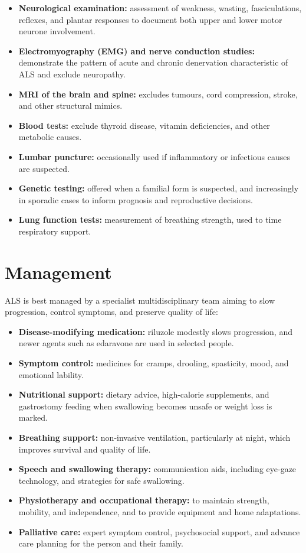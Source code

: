 \begin{itemize}
    \item \textbf{Neurological examination:} assessment of weakness, wasting, fasciculations, reflexes, and plantar responses to document both upper and lower motor neurone involvement.
    \item \textbf{Electromyography (EMG) and nerve conduction studies:} demonstrate the pattern of acute and chronic denervation characteristic of ALS and exclude neuropathy.
    \item \textbf{MRI of the brain and spine:} excludes tumours, cord compression, stroke, and other structural mimics.
    \item \textbf{Blood tests:} exclude thyroid disease, vitamin deficiencies, and other metabolic causes.
    \item \textbf{Lumbar puncture:} occasionally used if inflammatory or infectious causes are suspected.
    \item \textbf{Genetic testing:} offered when a familial form is suspected, and increasingly in sporadic cases to inform prognosis and reproductive decisions.
    \item \textbf{Lung function tests:} measurement of breathing strength, used to time respiratory support.
\end{itemize}

\section*{Management}
ALS is best managed by a specialist multidisciplinary team aiming to slow progression, control symptoms, and preserve quality of life:

\begin{itemize}
    \item \textbf{Disease-modifying medication:} riluzole modestly slows progression, and newer agents such as edaravone are used in selected people.
    \item \textbf{Symptom control:} medicines for cramps, drooling, spasticity, mood, and emotional lability.
    \item \textbf{Nutritional support:} dietary advice, high-calorie supplements, and gastrostomy feeding when swallowing becomes unsafe or weight loss is marked.
    \item \textbf{Breathing support:} non-invasive ventilation, particularly at night, which improves survival and quality of life.
    \item \textbf{Speech and swallowing therapy:} communication aids, including eye-gaze technology, and strategies for safe swallowing.
    \item \textbf{Physiotherapy and occupational therapy:} to maintain strength, mobility, and independence, and to provide equipment and home adaptations.
    \item \textbf{Palliative care:} expert symptom control, psychosocial support, and advance care planning for the person and their family.
\end{itemize}

